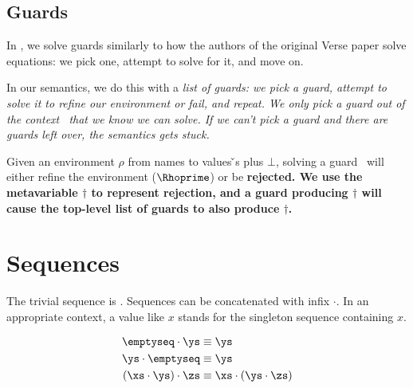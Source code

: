 \documentclass[]{article}
\begin{document}
    \bigskip
\subsection{Guards}

In {\VMinus}, we solve guards similarly to how the authors of the original Verse
paper solve equations: we pick one, attempt to solve for it, and move on. 

In our semantics, we do this with a \it{list} of guards: we pick a guard,
attempt to solve it to refine our environment or fail, and repeat. We only pick
a guard out of the context \context\ that we know we can solve. If we can't pick
a guard and there are guards left over, the semantics gets stuck.



Given an environment $\rho$ from names to values {\v}s plus $\bot$, solving a
guard \g\ will either refine the environment ($\Rhoprime$) or be \bf{rejected}.
We use the metavariable $\dagger$ to represent rejection, and a guard producing
$\dagger$ will cause the top-level list of guards to also produce $\dagger$. 

    \gfail
    
    \section{Sequences}
    
    The trivial sequence is \emptyseq. Sequences can be concatenated with infix 
$\cdot$. In an appropriate context, a value like $x$ stands for 
the singleton sequence containing $x$. 

\begin{align*}
    \emptyseq \cdot \ys &\equiv \ys \\
    \ys \cdot \emptyseq &\equiv \ys \\
    (\xs \cdot \ys) \cdot \zs &\equiv \xs \cdot (\ys \cdot \zs)
\end{align*}

\vmsemantics
\end{document}
